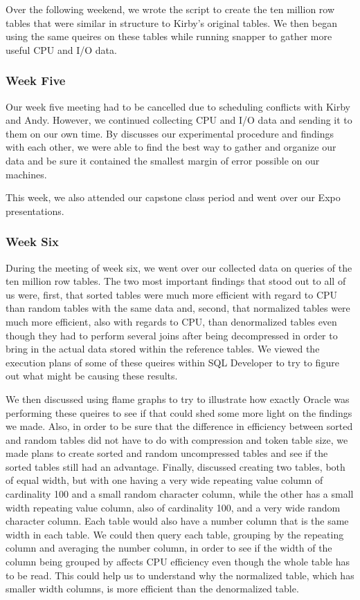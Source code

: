 \documentclass[10pt]{article}
\begin{document}
Over the following weekend, we wrote the script to create the ten million row tables that were similar in 
structure to Kirby's original tables. We then began using the same queires on these tables while running snapper 
to gather more useful CPU and I/O data. 

\subsubsection{Week Five}
Our week five meeting had to be cancelled due to scheduling conflicts with Kirby and Andy. However, we continued 
collecting CPU and I/O data and sending it to them on our own time. By discusses our experimental procedure and 
findings with each other, we were able to find the best way to gather and organize our data and be sure it 
contained the smallest margin of error possible on our machines. 

This week, we also attended our capstone class period and went over our Expo presentations. 

\subsubsection{Week Six}
During the meeting of week six, we went over our collected data on queries of the ten million row tables. The 
two most important findings that stood out to all of us were, first, that sorted tables were much more 
efficient with regard to CPU than random tables with the same data and, second, that normalized tables were much 
more efficient, also with regards to CPU, than denormalized tables even though they had to perform several joins 
after being decompressed in order to bring in the actual data stored within the reference tables. We viewed 
the execution plans of some of these queires within SQL Developer to try to figure out what might be causing 
these results. 

We then discussed using flame graphs to try to illustrate how exactly Oracle was performing these queires to see 
if that could shed some more light on the findings we made. Also, in order to be sure that the difference in 
efficiency between sorted and random tables did not have to do with compression and token table size, we made 
plans to create sorted and random uncompressed tables and see if the sorted tables still had an advantage. 
Finally, discussed creating two tables, both of equal width, but with one having a very wide repeating value 
column of cardinality 100 and a small random character column, while the other has a small width repeating 
value column, also of cardinality 100, and a very wide random character column. Each table would also have a 
number column that is the same width in each table. We could then query each table, grouping by the repeating 
column and averaging the number column, in order to see if the width of the column being grouped by affects 
CPU efficiency even though the whole table has to be read. This could help us to understand why the normalized 
table, which has smaller width columns, is more efficient than the denormalized table. 
\end{document}
